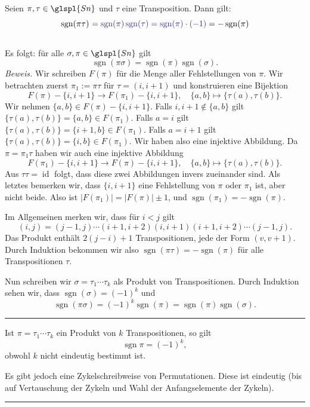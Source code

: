 \documentclass[9pt]{article}
\begin{document}
\begin{satz}
Seien $\pi, \tau \in \glspl{Sn}$ und $\tau$ eine Transposition. Dann gilt:
\[
\operatorname{sgn}(\pi \tau) \ \txc{ = \operatorname{sgn}(\pi) \operatorname{sgn}(\tau) = \operatorname{sgn}(\pi)  \cdot (-1)} =  -\operatorname{sgn}(\pi)
\]
 \\  Es folgt: für alle $\sigma, \pi \in \glspl{Sn}$ gilt
\[
\operatorname{sgn}(\pi \sigma) = \operatorname{sgn}(\pi) \operatorname{sgn}(\sigma).
\]
\textit{Beweis.} Wir schreiben $F(\pi)$ für die Menge aller Fehlstellungen von $\pi$. Wir betrachten zuerst $\pi_1 := \pi \tau$ für $\tau = (i, i + 1)$ und konstruieren eine Bijektion
\[
F(\pi) - \{i, i + 1\} \to F(\pi_1) - \{i, i + 1\}, \quad \{a, b\} \mapsto \{\tau(a), \tau(b)\}.
\]
Wir nehmen $\{a, b\} \in F(\pi) - \{i, i + 1\}$.
Falls $i, i + 1 \not\in \{a, b\}$ gilt $\{\tau(a), \tau(b)\} = \{a, b\} \in F(\pi_1)$.
Falls $a = i$ gilt $\{\tau(a), \tau(b)\} = \{i + 1, b\} \in F(\pi_1)$.
Falls $a = i + 1$ gilt $\{\tau(a), \tau(b)\} = \{i, b\} \in F(\pi_1)$.
Wir haben also eine injektive Abbildung. Da $\pi = \pi_1 \tau$ haben wir auch eine injektive Abbildung
\[
F(\pi_1) - \{i, i + 1\} \to F(\pi) - \{i, i + 1\}, \quad \{a, b\} \mapsto \{\tau(a), \tau(b)\}.
\]
Aus $\tau \tau = \operatorname{id}$ folgt, dass diese zwei Abbildungen invers zueinander sind.
Als letztes bemerken wir, dass $\{i, i + 1\}$ eine Fehlstellung von $\pi$ oder $\pi_1$ ist, aber nicht beide. Also ist $|F(\pi_1)| = |F(\pi)| \pm 1$, und $\operatorname{sgn}(\pi_1) = -\operatorname{sgn}(\pi)$.

Im Allgemeinen merken wir, dass für $i < j$ gilt
\[
(i, j) = (j - 1, j) \cdots (i + 1, i + 2)(i, i + 1)(i + 1, i + 2) \cdots (j - 1, j).
\]
Das Produkt enthält $2(j - i) + 1$ Transpositionen, jede der Form $(v, v + 1)$. Durch Induktion bekommen wir also $\operatorname{sgn}(\pi \tau) = -\operatorname{sgn}(\pi)$ für alle Transpositionen $\tau$.

Nun schreiben wir $\sigma = \tau_1 \cdots \tau_k$ als Produkt von Transpositionen. Durch Induktion sehen wir, dass $\operatorname{sgn}(\sigma) = (-1)^k$ und
\[
\operatorname{sgn}(\pi \sigma) = (-1)^k \operatorname{sgn}(\pi) = \operatorname{sgn}(\pi) \operatorname{sgn}(\sigma).
\]
 \end{satz} \noindent \rule{8cm}{0.4pt}

\begin{folg}
Ist $\pi = \tau_1 \cdots \tau_k$ ein Produkt von $k$ Transpositionen, so gilt
\[
\operatorname{sgn} \pi = (-1)^k,
\]
obwohl $k$ nicht eindeutig bestimmt ist.

Es gibt jedoch eine Zykelschreibweise von Permutationen. Diese ist eindeutig (bis auf Vertauschung der Zykeln und Wahl der Anfangselemente der Zykeln).

\end{folg} \noindent \rule{8cm}{0.4pt}
\end{document}
